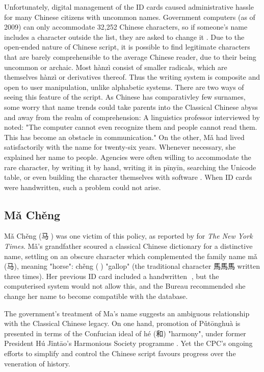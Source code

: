 Unfortunately, digital management of the ID cards caused administrative hassle
for many Chinese citizens with uncommon names. Government computers (as of 2009)
can only accommodate 32,252 Chinese characters, so if someone's name includes a
character outside the list, they are asked to change it
\parencite{lafraniere09}. Due to the open-ended nature of Chinese script, it is
possible to find legitimate characters that are barely comprehensible to the
average Chinese reader, due to their being uncommon or archaic. Most hànzì
consist of smaller radicals, which are themselves hànzì or derivatives thereof.
Thus the writing system is composite and open to user manipulation, unlike
alphabetic systems. There are two ways of seeing this feature of the script. As
Chinese has comparativley few surnames, some worry that name trends could take
parents into the Classical Chinese abyss and away from the realm of
comprehension: A linguistics professor interviewed by \textcite{lafraniere09}
noted: "The computer cannot even recognize them and people cannot read them.
This has become an obstacle in communication." On the other, Mǎ had lived
satisfactorily with the name for twenty-six years. Whenever necessary, she
explained her name to people. Agencies were often willing to accommodate the
rare character, by writing it by hand, writing it in pīnyīn, searching the
Unicode table, or even building the character themselves with software
\parencite{martinsen08}. When ID cards were handwritten, such a problem could
not arise.

\subsection{Mǎ Chěng}

Mǎ Chěng ({\zafont 马}{\zbfont 𩧢}) was one victim of this policy, as reported
by \textcite{lafraniere09} for \textit{The New York Times}. Mǎ's grandfather
scoured a classical Chinese dictionary for a distinctive name, settling on an
obscure character which complemented the family name mǎ ({\zafont 马}), meaning
"horse": chěng ({\zbfont 𩧢}) "gallop" (the traditional character
{\zafont 馬馬馬} written three times). Her previous ID card included a
handwritten {\zbfont 𩧢}, but the computerised system would not allow this,
and the Bureau recommended she change her name to become compatible with the
database.

The government's treatment of Ma's name suggests an ambiguous relationship with
the Classical Chinese legacy. On one hand, promotion of Pǔtōnghuà is presented
in terms of the Confucian ideal of hé ({\zafont 和}) "harmony", under former
President Hú Jǐntāo's Harmonious Society programme \parencite{wang16}. Yet the
CPC's ongoing efforts to simplify and control the Chinese script favours
progress over the veneration of history.

